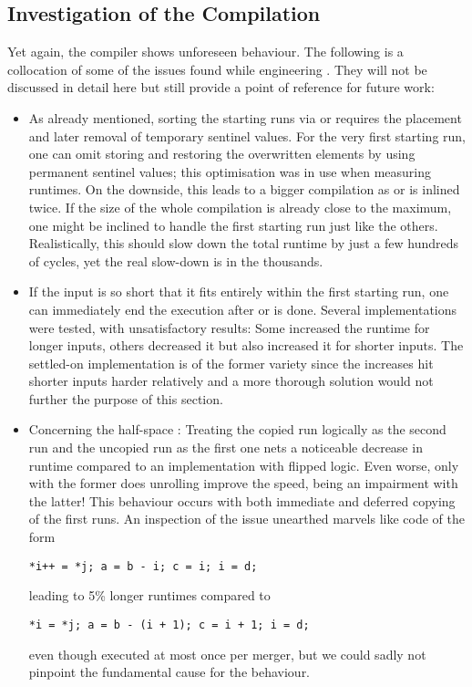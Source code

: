 \subsection*{Investigation of the Compilation}
\label{sec:tasklet:merge:compilation}

Yet again, the compiler shows unforeseen behaviour.
The following is a collocation of some of the issues found while engineering \MS{}.
They will not be discussed in detail here but still provide a point of reference for future work:
\begin{itemize}
	\item
	As already mentioned, sorting the starting runs via \IS{} or \ShS{} requires the placement and later removal of temporary sentinel values.
	For the very first starting run, one can omit storing and restoring the overwritten elements by using permanent sentinel values;
	this optimisation was in use when measuring runtimes.
	On the downside, this leads to a bigger compilation as \IS{} or \ShS{} is inlined twice.
	If the size of the whole compilation is already close to the maximum, one might be inclined to handle the first starting run just like the others.
	Realistically, this should slow down the total runtime by just a few hundreds of cycles, yet the real slow-down is in the thousands.

	\item
	If the input is so short that it fits entirely within the first starting run, one can immediately end the execution after \IS{} or \ShS{} is done.
	Several implementations were tested, with unsatisfactory results:
	Some increased the runtime for longer inputs, others decreased it but also increased it for shorter inputs.
	The settled-on implementation is of the former variety since the increases hit shorter inputs harder relatively and a more thorough solution would not further the purpose of this section.

	\item
	Concerning the half-space \MS{}:
	Treating the copied run logically as the second run and the uncopied run as the first one nets a noticeable decrease in runtime compared to an implementation with flipped logic.
	Even worse, only with the former does unrolling improve the speed, being an impairment with the latter!
	This behaviour occurs with both immediate and deferred copying of the first runs.
	An inspection of the issue unearthed marvels like code of the form
	\begin{center}
		\vspace{-\baselineskip}
		\texttt{*i++ = *j; a = b - i; c = i; i = d;}
	\end{center}
	leading to 5\% longer runtimes compared to
	\begin{center}
		\texttt{*i = *j; a = b - (i + 1); c = i + 1; i = d;}
	\end{center}
	even though executed at most once per merger, but we could sadly not pinpoint the fundamental cause for the behaviour.
\end{itemize}
